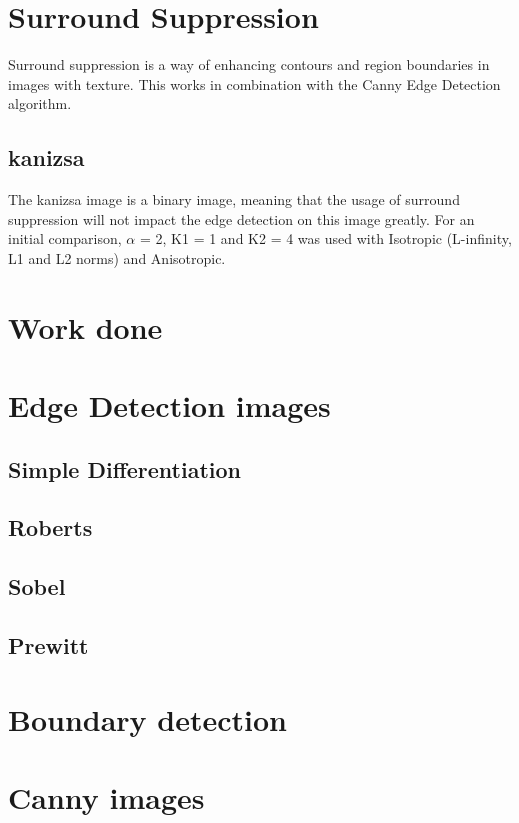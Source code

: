 \documentclass[10pt,a4paper]{article}
\begin{document}
\section{Surround Suppression}
Surround suppression is a way of enhancing contours and region boundaries in images with texture. This works in combination with the Canny Edge Detection algorithm.

\subsection{kanizsa}
The kanizsa image is a binary image, meaning that the usage of surround suppression will not impact the edge detection on this image greatly.
For an initial comparison, $\alpha$ = 2, K1 = 1 and K2 = 4 was used with Isotropic (L-infinity, L1 and L2 norms) and Anisotropic.

\section{Work done}

\section{Edge Detection images}
\subsection{Simple Differentiation}



\subsection{Roberts}


\subsection{Sobel}


\subsection{Prewitt}


\section{Boundary detection}


\section{Canny images}
\end{document}
